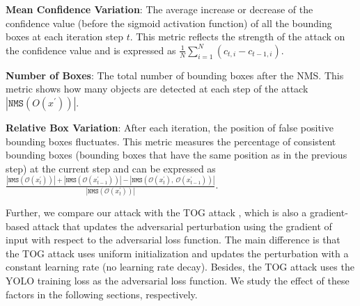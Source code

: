 \textbf{Mean Confidence Variation}: The average increase or decrease of the confidence value (before the sigmoid activation function) of all the bounding boxes at each iteration step $t$. This metric reflects the strength of the attack on the confidence value and is expressed as $\frac{1}{N}\sum_{i=1}^{N}{( c_{t,i} - c_{t-1,i} )}$.

\textbf{Number of Boxes}: The total number of bounding boxes after the NMS. This metric shows how many objects are detected at each step of the attack $|\texttt{NMS}(O(x^{'}))|$.

\textbf{Relative Box Variation}: After each iteration, the position of false positive bounding boxes fluctuates. This metric measures the percentage of consistent bounding boxes (bounding boxes that have the same position as in the previous step) at the current step and can be expressed as $\frac{|\texttt{NMS}(\mathcal{O}(x_t^{'}))| + |\texttt{NMS}(\mathcal{O}(x_{t-1}^{'}))| - |\texttt{NMS}(\mathcal{O}(x_{t}^{'}),\ \mathcal{O}(x_{t-1}^{'}))|}{|\texttt{NMS}(\mathcal{O}(x_t^{'}))|}$.

Further, we compare our attack with the TOG attack \citep{chow2020adversarial}, which is also a gradient-based attack that updates the adversarial perturbation using the gradient of input with respect to the adversarial loss function. The main difference is that the TOG attack uses uniform initialization and updates the perturbation with a constant learning rate (no learning rate decay). Besides, the TOG attack uses the YOLO training loss \citep{redmon2018yolov3, bochkovskiy2020yolov4} as the adversarial loss function. We study the effect of these factors in the following sections, respectively.

